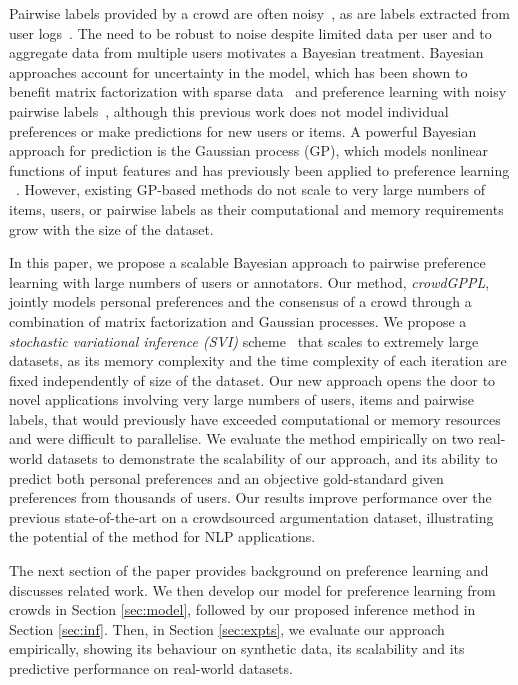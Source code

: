 Pairwise labels provided by a crowd are often noisy~\citep{chen2013pairwise}, 
as are labels extracted from user logs~\citep{hu2008collaborative}.
The need to be robust to noise despite limited data per user
and to aggregate data from multiple users
motivates a Bayesian treatment.
Bayesian approaches account for uncertainty in the model,
which has been shown to benefit matrix factorization with sparse data~\citep{salakhutdinov2008bayesian}
and preference learning with noisy pairwise labels~\citep{chen2013pairwise},
although this previous work does not model individual preferences or make predictions for new users or items.
A powerful Bayesian approach for prediction is the Gaussian process (GP), 
which models nonlinear functions of input features
and has previously been applied to preference learning
~\citep{chu2005preference,houlsby2012collaborative,khan2014scalable}.
However, existing GP-based methods do not scale to very large numbers of items, users, or
pairwise labels as their computational and memory requirements grow with the size of the dataset.

In this paper, we propose a scalable Bayesian approach to pairwise preference learning with 
large numbers of users or annotators. %
Our method, \emph{crowdGPPL},
 jointly models personal preferences and the consensus of a crowd through a combination of
matrix factorization and Gaussian processes. 
We propose a \emph{stochastic variational inference (SVI)} scheme~\citep{hoffman2013stochastic}
that scales to extremely large datasets, as its
memory complexity and the time complexity of each iteration are 
fixed independently of size of the dataset.
Our new approach opens the door to novel applications involving very large numbers of users, items and pairwise labels,
that would previously have exceeded computational or memory resources and were difficult to parallelise.
We evaluate the method empirically on two real-world datasets to demonstrate 
the scalability of our approach,
and its ability to predict both personal preferences and an objective gold-standard given 
preferences from thousands of users.
Our results improve performance over the previous state-of-the-art \citep{simpson2018finding} on a crowdsourced argumentation dataset, illustrating the potential of the method for NLP applications.

The next section of the paper provides background on preference learning
and discusses related work.
We then develop our model for preference learning from crowds in Section \ref{sec:model},
followed by our proposed inference method in Section \ref{sec:inf}.
Then, in Section \ref{sec:expts}, 
we evaluate our approach empirically, showing its behaviour on synthetic data, 
its scalability and its predictive performance on real-world datasets.
